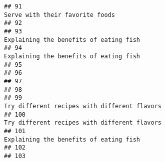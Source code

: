 \documentclass[
]{article}
\begin{document}
\begin{verbatim}
## 91                                                                                                                                                                               Serve with their favorite foods
## 92                                                                                                                                                                                                              
## 93                                                                                                                                                                        Explaining the benefits of eating fish
## 94                                                                                                                                                                        Explaining the benefits of eating fish
## 95                                                                                                                                                                                                              
## 96                                                                                                                                                                                                              
## 97                                                                                                                                                                                                              
## 98                                                                                                                                                                                                              
## 99                                                                                                                                                                  Try different recipes with different flavors
## 100                                                                                                                                                                 Try different recipes with different flavors
## 101                                                                                                                                                                       Explaining the benefits of eating fish
## 102                                                                                                                                                                                                             
## 103                                                                                                                                                                                                             

\end{verbatim}
\end{document}
